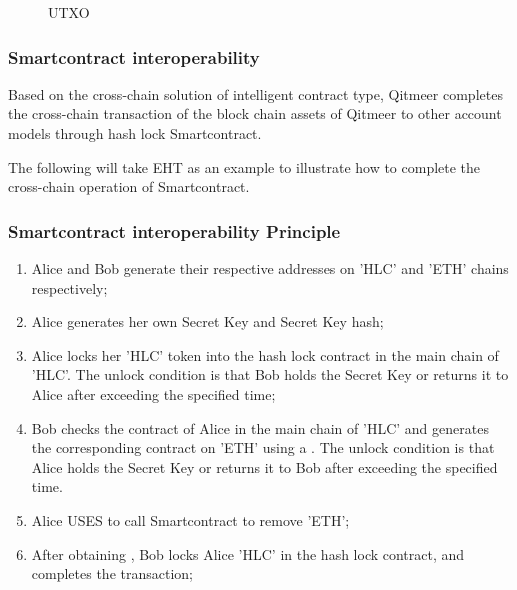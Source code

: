 \documentclass[a4paper,11pt]{article}
\begin{document}
\begin{figure}[hbt]
	\centerline{%
	}
\caption{UTXO}
\end{figure}



\subsubsection{Smartcontract interoperability}

Based on the cross-chain solution of intelligent contract type, Qitmeer completes the cross-chain transaction of the block chain assets of Qitmeer to other account models through hash lock Smartcontract.

The following will take EHT as an example to illustrate how to complete the cross-chain operation of Smartcontract.

\subsubsection*{Smartcontract interoperability Principle} 

\begin{enumerate}
\item  Alice and Bob generate their respective addresses on 'HLC' and 'ETH' chains respectively;

\item   Alice generates her own Secret Key and Secret Key hash;

 \item  Alice locks her 'HLC' token into the hash lock contract in the main chain of 'HLC'. The unlock condition is that Bob holds the Secret Key or returns it to Alice after exceeding the specified time;

 \item  Bob checks the contract of Alice in the main chain of 'HLC' and generates the corresponding contract on 'ETH' using a . The unlock condition is that Alice holds the Secret Key or returns it to Bob after exceeding the specified time.

 \item  Alice USES to call Smartcontract to remove 'ETH';

 \item  After obtaining , Bob locks Alice 'HLC' in the hash lock contract, and completes the transaction;
	
\end{enumerate}
\end{document}
